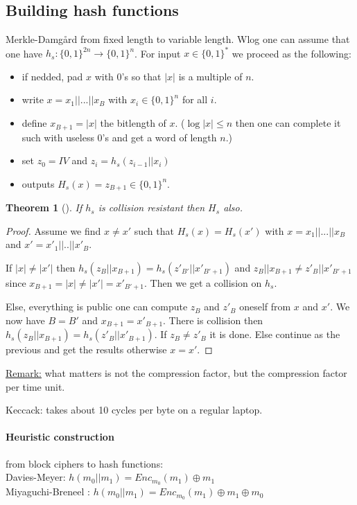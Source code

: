 \documentclass{article}
\newtheorem{thm}{Theorem}[section]
\newcommand{\Thm}[3]{\begin{thm}[#1]\label{#2}#3\end{thm}}
\newcommand{\Rem}{\underline{Remark:} }
\newcommand{\bit}{\{0,1\}}
\begin{document}
\subsection{Building hash functions}
Merkle-Damg\aa rd from fixed length to variable length. Wlog one can assume that one have $h_s:\bit^{2n}\rightarrow\bit^n$. For input $x\in\bit^*$ we proceed as the following:\begin{itemize}
\item if nedded, pad $x$ with $0$'s so that $|x|$ is a multiple of $n$.
\item write $x=x_1||...||x_B$ with $x_i\in\bit^n$ for all $i$.
\item define $x_{B+1}=|x|$ the bitlength of $x$. ($\log|x|\leq n$ then one can complete it such with useless $0$'s and get a word of length $n$.)
\item set $z_0=IV$ and $z_i=h_s(z_{i-1}||x_i)$
\item outputs $H_s(x)=z_{B+1}\in\bit^n$.
\end{itemize}

\Thm{}{}{If $h_s$ is collision resistant then $H_s$ also.}
\begin{proof}
Assume we find $x\neq x'$ such that $H_s(x)=H_s(x')$ with $x=x_1||...||x_{B}$ and $x'=x'_1||..||x'_B$.

If $|x|\neq |x'|$ then $h_s(z_B||x_{B+1})=h_s(z'_{B'}||x'_{B'+1})$ and  $z_B||x_{B+1}\neq z'_B||x'_{B'+1}$ since $x_{B+1}=|x|\neq|x'|=x'_{B'+1}$. Then we get a collision on $h_s$.

Else, everything is public one can compute $z_B$ and $z'_B$ oneself from $x$ and $x'$. We now have $B=B'$ and $x_{B+1}=x'_{B+1}$. There is collision then $h_s(z_B||x_{B+1})=h_s(z'_{B}||x'_{B+1})$. If $z_B\neq z'_B$ it is done. Else continue as the previous and get the results otherwise $x=x'$.
\end{proof}

\Rem what matters is not the compression factor, but the compression factor per time unit. 

Keccack: takes about 10 cycles per byte on a regular laptop.

\paragraph{Heuristic construction} from block ciphers to hash functions:\\
Davies-Meyer: $h(m_0||m_1)=Enc_{m_0}(m_1)\oplus m_1$\\
Miyaguchi-Breneel : $h(m_0||m_1)=Enc_{m_0}(m_1)\oplus m_1\oplus m_0$
\end{document}
